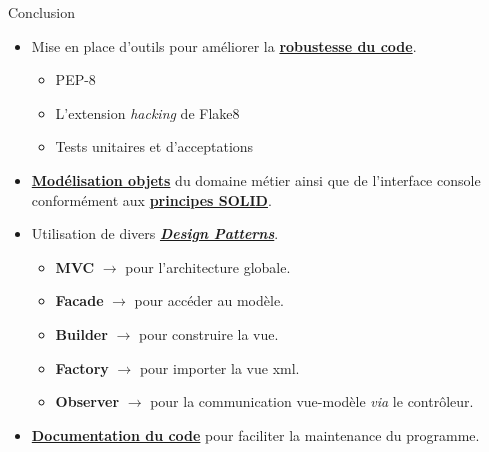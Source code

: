 \begin{frame}{Conclusion}
  \begin{itemize}
  \item Mise en place d'outils pour améliorer la
    \underline{\textbf{robustesse du code}}.
    \begin{itemize}
    \item PEP-8
    \item L'extension \textit{hacking} de Flake8
    \item Tests unitaires et d'acceptations
    \end{itemize}
  \item \underline{\textbf{Modélisation objets}} du domaine métier
    ainsi que de l'interface console conformément aux \underline{\textbf{principes SOLID}}.
  \item Utilisation de divers \underline{\textit{\textbf{Design
        Patterns}}}.
    \begin{itemize}
    \item \textbf{MVC} $\rightarrow$ pour l'architecture globale.
    \item \textbf{Facade} $\rightarrow$ pour accéder au modèle.
    \item \textbf{Builder} $\rightarrow$ pour construire la vue.
    \item \textbf{Factory} $\rightarrow$ pour importer la vue xml.
    \item \textbf{Observer} $\rightarrow$ pour la communication
      vue-modèle \textit{via} le contrôleur.
    \end{itemize}
  \item \underline{\textbf{Documentation du code}} pour faciliter la
    maintenance du programme.
  \end{itemize}  
\end{frame}



